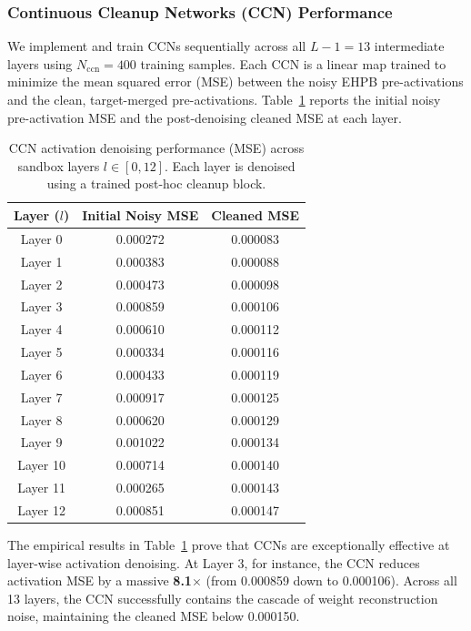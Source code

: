 \subsubsection{Continuous Cleanup Networks (CCN) Performance}

We implement and train CCNs sequentially across all $L-1 = 13$ intermediate layers using $N_{\text{ccn}} = 400$ training samples. Each CCN is a linear map trained to minimize the mean squared error (MSE) between the noisy EHPB pre-activations and the clean, target-merged pre-activations. Table~\ref{tab:ccn_mse} reports the initial noisy pre-activation MSE and the post-denoising cleaned MSE at each layer.

\begin{table}[h]
\caption{CCN activation denoising performance (MSE) across sandbox layers $l \in [0, 12]$. Each layer is denoised using a trained post-hoc cleanup block.}
\label{tab:ccn_mse}
\vskip 0.15in
\begin{center}
\begin{small}
\begin{sc}
\begin{tabular}{ccc}
\toprule
Layer ($l$) & Initial Noisy MSE & Cleaned MSE \\
\midrule
Layer 0 & 0.000272 & 0.000083 \\
Layer 1 & 0.000383 & 0.000088 \\
Layer 2 & 0.000473 & 0.000098 \\
Layer 3 & 0.000859 & 0.000106 \\
Layer 4 & 0.000610 & 0.000112 \\
Layer 5 & 0.000334 & 0.000116 \\
Layer 6 & 0.000433 & 0.000119 \\
Layer 7 & 0.000917 & 0.000125 \\
Layer 8 & 0.000620 & 0.000129 \\
Layer 9 & 0.001022 & 0.000134 \\
Layer 10 & 0.000714 & 0.000140 \\
Layer 11 & 0.000265 & 0.000143 \\
Layer 12 & 0.000851 & 0.000147 \\
\bottomrule
\end{tabular}
\end{sc}
\end{small}
\end{center}
\vskip -0.1in
\end{table}

The empirical results in Table~\ref{tab:ccn_mse} prove that CCNs are exceptionally effective at layer-wise activation denoising. At Layer 3, for instance, the CCN reduces activation MSE by a massive \textbf{8.1$\times$} (from 0.000859 down to 0.000106). Across all 13 layers, the CCN successfully contains the cascade of weight reconstruction noise, maintaining the cleaned MSE below 0.000150.

